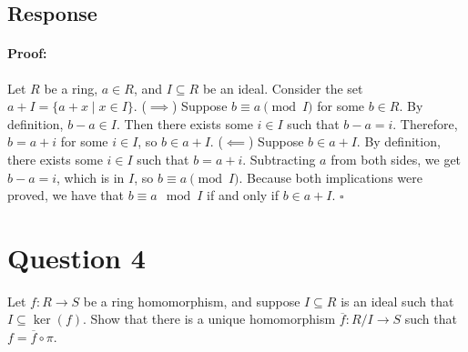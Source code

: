 \documentclass [12pt] {article}
\newenvironment{proof}{\paragraph{Proof:}}{\hfill$\square$}
\begin{document}
\subsection*{Response}
\begin{proof}
    Let $R$ be a ring, $a \in R$, and $I \subseteq R$ be an ideal. Consider the set 
    $a + I = \{ a + x \mid x \in I \}$.
    \newline
    ($\implies$) Suppose $b \equiv a \pmod{I}$ for some $b \in R$. By definition, $b - a \in I$. 
    Then there exists some $i \in I$ such that $b - a = i$. Therefore, $b = a + i$ for some 
    $i \in I$, so $b \in a + I$.
    \newline
    ($\impliedby$) Suppose $b \in a + I$. By definition, there exists some $i \in I$ such that
    $b = a + i$. Subtracting $a$ from both sides, we get $b - a = i$, which is in $I$, so 
    $b \equiv a \pmod{I}$.
    Because both implications were proved, we have that $b \equiv a \mod{I}$ if and only if $b \in a + I$.
\end{proof}
\newpage

\section*{Question 4}
Let $f:R\to S$ be a ring homomorphism, and suppose $I\subseteq R$ is an ideal such that $I\subseteq \ker(f)$. Show that there is a unique homomorphism $\overline{f}:R/I\to S$ such that $f=\overline{f}\circ\pi$.
\end{document}
